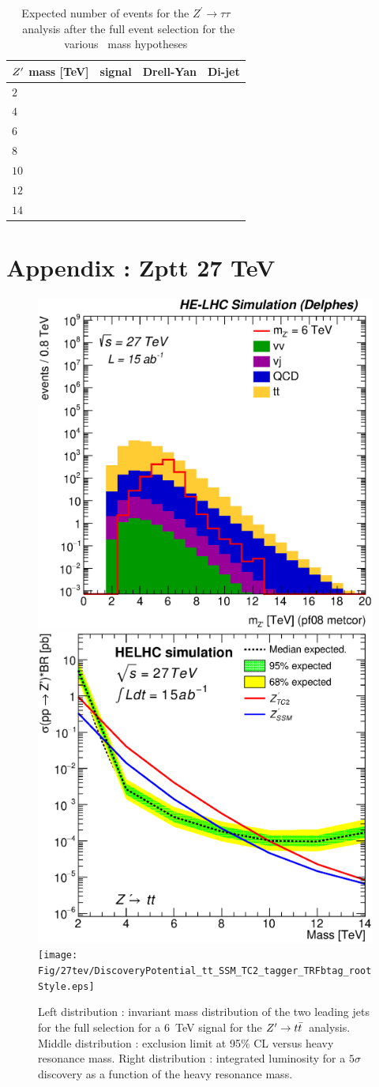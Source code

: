 \documentclass{cernrep}
\newcommand*{\Zptata}{\ensuremath{Z^{\prime}\rightarrow \tau\tau}}
\newcommand*{\zptt}{\ensuremath{Z^{\prime} \rightarrow \ttbar}}
\begin{document}
\begin{table}[!htb]
   \centering
\begin{tabular}{|l|r|r|r|}
  \hline
  \hline
$Z^{\prime}$ mass [TeV]  & signal &  Drell-Yan & Di-jet \\
  \hline
  $2$  &   &   &    \\
  $4$  &   &   &    \\
  $6$  &   &   &    \\
  $8$  &   &   &    \\
  $10$ &   &   &    \\
  $12$ &   &   &    \\
  $14$ &   &   &    \\
  \hline
  \hline
\end{tabular}
  \caption{Expected number of events for the \Zptata\ analysis after the full event selection for the various \Zp\ mass hypotheses}
  \label{tab:leptonicresonances27:yieldstautau}
\end{table}

\clearpage
\newpage

\section{Appendix : Zptt 27 TeV}
\label{appendix:zptt27}

\begin{figure}[!htb]
  \centering
  \includegraphics[width=0.30\columnwidth]{Fig/27tev/Zptt_Mj1j2_pf08_MetCorr_fit_sel8_nostack_log.eps}
  \includegraphics[width=0.30\columnwidth]{Fig/27tev/lim_Zprime_tt_helhc_v01.eps}
  \texttt{[image: Fig/27tev/DiscoveryPotential\_tt\_SSM\_TC2\_tagger\_TRFbtag\_rootStyle.eps]}
  \caption{Left distribution : invariant mass distribution of the two leading jets for the full selection for a 6~TeV signal for the \zptt\ analysis. Middle distribution : exclusion limit at 95\% CL versus heavy resonance mass. Right distribution : integrated luminosity for a $5\sigma$ discovery as a function of the heavy resonance mass.}
  \label{figure:hadronicresonances27:ttsel08}
\end{figure}
\end{document}
